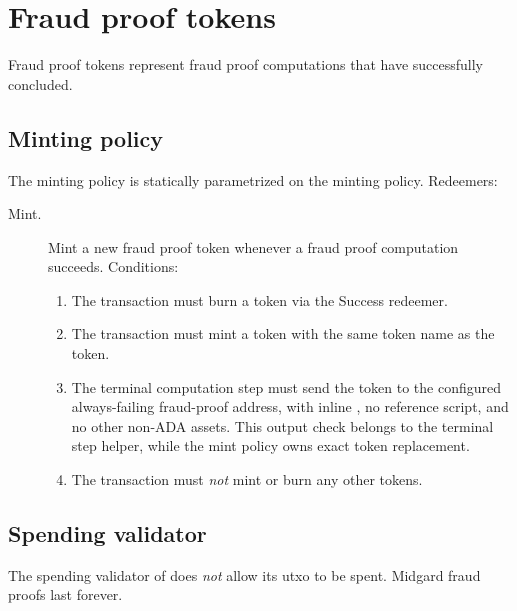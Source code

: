 \documentclass[../midgard.tex]{subfiles}
\begin{document}
\section{Fraud proof tokens}
\label{h:fraud-proof-tokens}

Fraud proof tokens represent fraud proof computations that have successfully concluded.

\subsection{Minting policy}
\label{h:fraud-proof-tokens-minting-policy}

The  minting policy is statically parametrized on the  minting policy.
Redeemers:

\begin{description}
    \item[Mint.] Mint a new fraud proof token whenever a fraud proof computation succeeds.
      Conditions:
        \begin{enumerate}
            \item The transaction must burn a  token via the Success redeemer.
            \item The transaction must mint a  token with the same token name as the  token.
            \item The terminal computation step must send the  token to the configured always-failing fraud-proof address, with inline , no reference script, and no other non-ADA assets. This output check belongs to the terminal step helper, while the mint policy owns exact token replacement.
            \item The transaction must \emph{not} mint or burn any other tokens.
        \end{enumerate}
\end{description}

\subsection{Spending validator}
\label{h:fraud-proof-tokens-spending-validator}

The spending validator of  does \emph{not} allow its utxo to be spent.
Midgard fraud proofs last forever.
\end{document}

